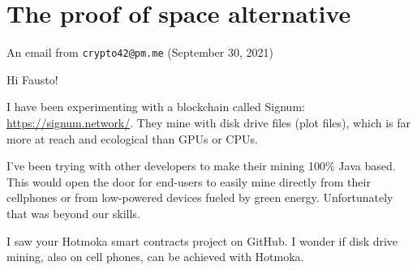 \documentclass[11pt]{beamer}  %
\begin{document}
\section{The proof of space alternative}

\begin{frame}{An email from \texttt{crypto42@pm.me} (September 30, 2021)}

  \begin{greenbox}{}
    Hi Fausto!

    \vspace{2ex}

    I have been experimenting with a blockchain called \alert{Signum: \url{https://signum.network/}}.
    They \alert{mine with
    disk drive files (plot files)}, which is far more at reach
    and \alert{ecological} than GPUs or CPUs.

    \vspace{1ex}

    I've been trying with other developers to make their mining 100\%
    Java based. This would open the door for end-users to easily \alert{mine directly
    from their cellphones} or from low-powered devices fueled by \alert{green energy}.
    Unfortunately that was beyond our skills.

    \vspace{1ex}

    I saw your Hotmoka smart contracts project on GitHub.
    I wonder if disk drive mining, also on cell phones, can be achieved with Hotmoka.
  \end{greenbox}

\end{frame}
\end{document}

